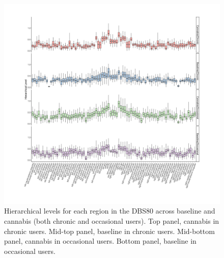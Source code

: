 \begin{figure}[h!]
    \centering
    \includegraphics[width=\textwidth]{images/Appendix_ Cannab HL.png}
    \caption[Hierarchical levels under baseline and cannabis in chronic and occasional users.]{Hierarchical levels for each region in the DBS80 across baseline and cannabis (both chronic and occasional users). Top panel, cannabis in chronic users. Mid-top panel, baseline in chronic users. Mid-bottom panel, cannabis in occasional users. Bottom panel, baseline in occasional users.}
    \label{fig:cannabishl}
\end{figure}